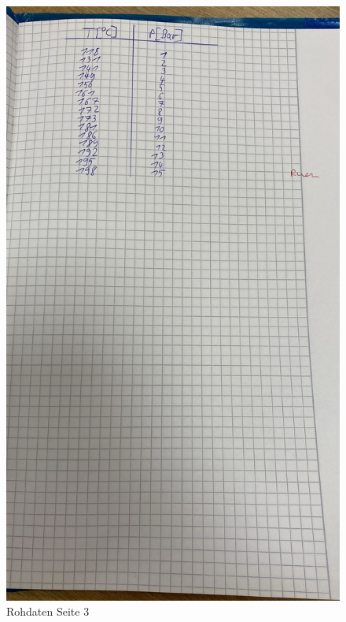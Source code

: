 \begin{figure}
  \centering
  \includegraphics[width=\textwidth, angle=270]{Bilder/data3.jpg}
  \caption{Rohdaten Seite 3}
  \label{fig:Data2}
\end{figure}


